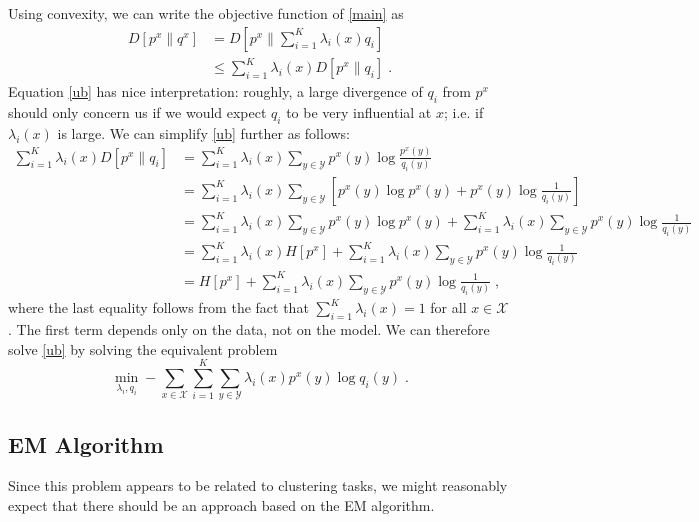 \documentclass[english]{scrartcl}
\begin{document}
		Using convexity, we can write the objective function of \eqref{main} as
		\begin{align}
			D[p^x\|q^x] &= D\left[p^x\bigg\|\sum_{i=1}^K\lambda_i(x)q_i\right] \\
			&\leq \sum_{i=1}^K\lambda_i(x)D\left[p^x\|q_i\right]\;. \label{ub}
		\end{align}
		Equation \eqref{ub} has nice interpretation: roughly, a large divergence of $q_i$ from $p^x$ should only concern us if we would expect $q_i$ to be very influential at $x$; i.e. if $\lambda_i(x)$ is large.
		We can simplify \eqref{ub} further as follows:
		\begin{align*}
			\sum_{i=1}^K\lambda_i(x)D\left[p^x\|q_i\right] &= \sum_{i=1}^K\lambda_i(x)\sum_{y \in \mathcal{Y}} p^x(y) \log\frac{p^x(y)}{q_i(y)} \\
			&= \sum_{i=1}^K\lambda_i(x)\sum_{y \in \mathcal{Y}} \left[ p^x(y) \log p^x(y) + p^x(y) \log \frac{1}{q_i(y)}\right] \\
			&= \sum_{i=1}^K\lambda_i(x)\sum_{y \in \mathcal{Y}}  p^x(y) \log p^x(y) + \sum_{i=1}^K\lambda_i(x)\sum_{y \in \mathcal{Y}} p^x(y) \log \frac{1}{q_i(y)} \\
			&= \sum_{i=1}^K\lambda_i(x)H[p^x] + \sum_{i=1}^K\lambda_i(x)\sum_{y \in \mathcal{Y}} p^x(y) \log \frac{1}{q_i(y)} \\
			&= H[p^x] + \sum_{i=1}^K\lambda_i(x)\sum_{y \in \mathcal{Y}} p^x(y) \log \frac{1}{q_i(y)}\;,
		\end{align*}
		where the last equality follows from the fact that $\sum_{i=1}^K \lambda_i(x) = 1$ for all $x\in \mathcal{X}$. The first term depends only on the data, not on the model. We can therefore solve \eqref{ub} by solving the equivalent problem
		\begin{equation}
			\min_{\lambda_i, q_i} - \sum_{x \in \mathcal{X}}\sum_{i=1}^K\sum_{y \in \mathcal{Y}}\lambda_i(x) p^x(y) \log q_i(y)\;.
		\end{equation}

	\subsection{EM Algorithm}
		Since this problem appears to be related to clustering tasks, we might reasonably expect that there should be an approach based on the EM algorithm.
\end{document}
